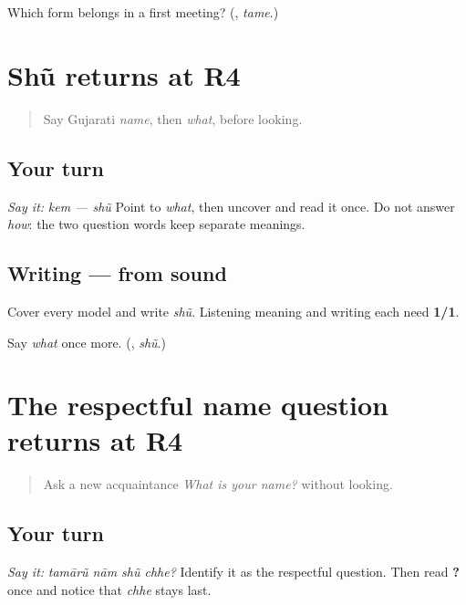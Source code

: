\begin{tcolorbox}[breakable,colback=teal!4,colframe=teal!35!black,title={Before you move on}]
Which form belongs in a first meeting? (\textbf{}, \emph{tame}.)
\end{tcolorbox}
\section[Practice]{Shũ returns at R4}

\label{lesson:GU-R17-shun-r4}



\begin{quote}
Say Gujarati \emph{name}, then \emph{what}, before looking.
\end{quote}

\subsection*{Your turn}
\emph{Say it:} \emph{kem — shũ} Point to \emph{what}, then uncover \textbf{} and read it once. Do not answer \emph{how}: the two question words keep separate meanings.

\subsection*{Writing — from sound}
Cover every model and write \emph{shũ}. Listening meaning and writing each need \textbf{1/1}.

\begin{tcolorbox}[breakable,colback=teal!4,colframe=teal!35!black,title={Before you move on}]
Say \emph{what} once more. (\textbf{}, \emph{shũ}.)
\end{tcolorbox}
\section[Practice]{The respectful name question returns at R4}

\label{lesson:GU-R17-whats-your-name-r4}



\begin{quote}
Ask a new acquaintance \emph{What is your name?} without looking.
\end{quote}

\subsection*{Your turn}
\emph{Say it:} \emph{tamārũ nām shũ chhe?} Identify it as the respectful question. Then read \textbf{   ?} once and notice that \emph{chhe} stays last.

